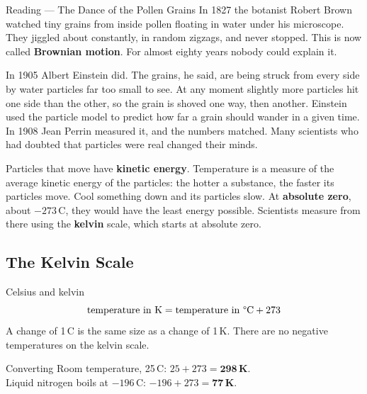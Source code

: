 \begin{readingbox}{Reading --- The Dance of the Pollen Grains}
In 1827 the botanist Robert Brown watched tiny grains from inside pollen floating in water under his microscope. They jiggled about constantly, in random zigzags, and never stopped. This is now called \textbf{Brownian motion}. For almost eighty years nobody could explain it.

In 1905 Albert Einstein did. The grains, he said, are being struck from every side by water particles far too small to see. At any moment slightly more particles hit one side than the other, so the grain is shoved one way, then another. Einstein used the particle model to predict how far a grain should wander in a given time. In 1908 Jean Perrin measured it, and the numbers matched. Many scientists who had doubted that particles were real changed their minds.

Particles that move have \textbf{kinetic energy}. Temperature is a measure of the average kinetic energy of the particles: the hotter a substance, the faster its particles move. Cool something down and its particles slow. At \textbf{absolute zero}, about $-273$\,\textdegree C, they would have the least energy possible. Scientists measure from there using the \textbf{kelvin} scale, which starts at absolute zero.
\end{readingbox}

\rcreset
{}

\label{theory:3}

\subsection{The Kelvin Scale}\label{sub:a3.1}

\begin{skillbox}{Celsius and kelvin}
\[ \text{temperature in K} = \text{temperature in \textdegree C} + 273 \]
A change of 1\,\textdegree C is the same size as a change of 1\,K. There are no negative temperatures on the kelvin scale.
\end{skillbox}

\begin{workedex}{Converting}
Room temperature, 25\,\textdegree C: $25 + 273 = \mathbf{298\,K}$.\\
Liquid nitrogen boils at $-196$\,\textdegree C: $-196 + 273 = \mathbf{77\,K}$.
\end{workedex}

